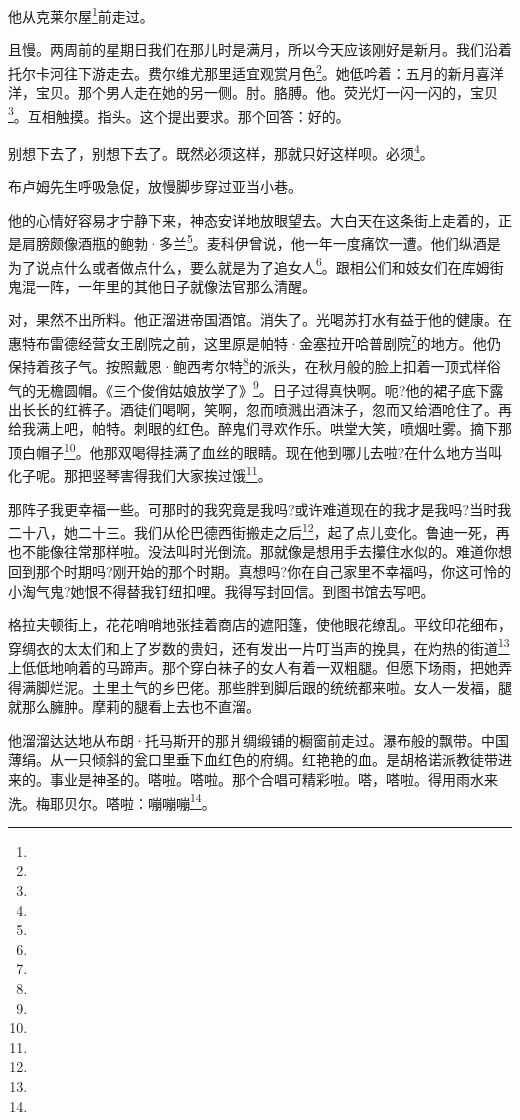 \par 他从克莱尔屋\footnote{}前走过。
\par 且慢。两周前的星期日我们在那儿时是满月，所以今天应该刚好是新月。我们沿着托尔卡河往下游走去。费尔维尤那里适宜观赏月色\footnote{}。她低吟着：五月的新月喜洋洋，宝贝。那个男人走在她的另一侧。肘。胳膊。他。荧光灯一闪一闪的，宝贝\footnote{}。互相触摸。指头。这个提出要求。那个回答：好的。
\par 别想下去了，别想下去了。既然必须这样，那就只好这样呗。必须\footnote{}。
\par 布卢姆先生呼吸急促，放慢脚步穿过亚当小巷。
\par 他的心情好容易才宁静下来，神态安详地放眼望去。大白天在这条街上走着的，正是肩膀颇像酒瓶的鲍勃·多兰\footnote{}。麦科伊曾说，他一年一度痛饮一遭。他们纵酒是为了说点什么或者做点什么，要么就是为了追女人\footnote{}。跟相公们和妓女们在库姆街鬼混一阵，一年里的其他日子就像法官那么清醒。
\par 对，果然不出所料。他正溜进帝国酒馆。消失了。光喝苏打水有益于他的健康。在惠特布雷德经营女王剧院之前，这里原是帕特·金塞拉开哈普剧院\footnote{}的地方。他仍保持着孩子气。按照戴恩·鲍西考尔特\footnote{}的派头，在秋月般的脸上扣着一顶式样俗气的无檐圆帽。《三个俊俏姑娘放学了》\footnote{}。日子过得真快啊。呃?他的裙子底下露出长长的红裤子。酒徒们喝啊，笑啊，忽而喷溅出酒沫子，忽而又给酒呛住了。再给我满上吧，帕特。刺眼的红色。醉鬼们寻欢作乐。哄堂大笑，喷烟吐雾。摘下那顶白帽子\footnote{}。他那双喝得挂满了血丝的眼睛。现在他到哪儿去啦?在什么地方当叫化子呢。那把竖琴害得我们大家挨过饿\footnote{}。
\par 那阵子我更幸福一些。可那时的我究竟是我吗?或许难道现在的我才是我吗?当时我二十八，她二十三。我们从伦巴德西街搬走之后\footnote{}，起了点儿变化。鲁迪一死，再也不能像往常那样啦。没法叫时光倒流。那就像是想用手去攥住水似的。难道你想回到那个时期吗?刚开始的那个时期。真想吗?你在自己家里不幸福吗，你这可怜的小淘气鬼?她恨不得替我钉纽扣哩。我得写封回信。到图书馆去写吧。
\par 格拉夫顿街上，花花哨哨地张挂着商店的遮阳篷，使他眼花缭乱。平纹印花细布，穿绸衣的太太们和上了岁数的贵妇，还有发出一片叮当声的挽具，在灼热的街道\footnote{}上低低地响着的马蹄声。那个穿白袜子的女人有着一双粗腿。但愿下场雨，把她弄得满脚烂泥。土里土气的乡巴佬。那些胖到脚后跟的统统都来啦。女人一发福，腿就那么臃肿。摩莉的腿看上去也不直溜。
\par 他溜溜达达地从布朗·托马斯开的那爿绸缎铺的橱窗前走过。瀑布般的飘带。中国薄绢。从一只倾斜的瓮口里垂下血红色的府绸。红艳艳的血。是胡格诺派教徒带进来的。事业是神圣的。嗒啦。嗒啦。那个合唱可精彩啦。嗒，嗒啦。得用雨水来洗。梅耶贝尔。嗒啦：嘣嘣嘣\footnote{}。
